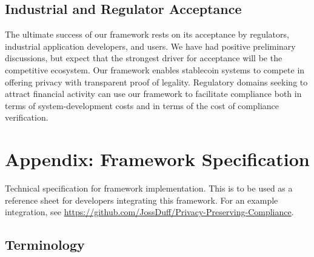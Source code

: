 \documentclass[9pt]{extreport}
\begin{document}
\section{Industrial and Regulator Acceptance}
The ultimate success of our framework rests on its acceptance by regulators, industrial application developers, and users.  We have had positive preliminary discussions, but expect that the strongest
driver for acceptance will be the competitive ecosystem.  Our framework enables stablecoin systems
to compete in offering privacy with transparent proof of legality.  Regulatory domains seeking to attract financial activity can use our framework to facilitate compliance both in terms of system-development costs and in terms of the cost of compliance verification.

\clearpage
{}


\clearpage

\appendix
\chapter{Appendix: Framework Specification}
\label{sec:framework-spec}
Technical specification for framework implementation.  This is to be used as a reference sheet for developers integrating this framework.  For an example integration, see \url{https://github.com/JossDuff/Privacy-Preserving-Compliance}.

\section{Terminology}
\label{sec:terminology}
\end{document}
